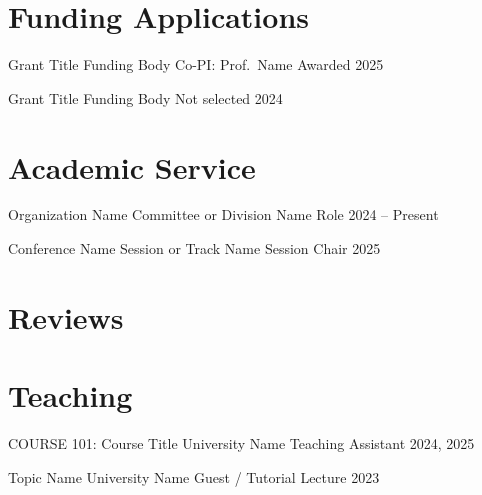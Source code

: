\documentclass{long-CV}
\begin{document}
\cvtalkend

\section{Funding Applications}

\cvgrant
  {Grant Title}
  {Funding Body}
  {Co-PI: Prof.\ Name}
  {Awarded}
  {2025}

\cvgrant
  {Grant Title}
  {Funding Body}
  {}
  {Not selected}
  {2024}

\section{Academic Service}

\cvgrant
  {Organization Name}
  {Committee or Division Name}
  {Role}
  {}
  {2024 -- Present}

\cvgrant
  {Conference Name}
  {Session or Track Name}
  {Session Chair}
  {}
  {2025}

\section{Reviews}


\section{Teaching}

\cvgrant
  {COURSE 101: Course Title}
  {University Name}
  {Teaching Assistant}
  {}
  {2024, 2025}

\cvgrant
  {Topic Name}
  {University Name}
  {Guest / Tutorial Lecture}
  {}
  {2023}
\end{document}
